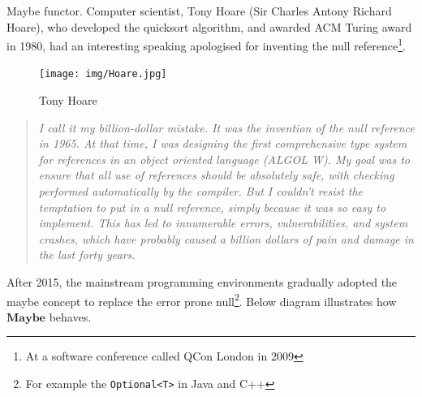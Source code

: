 \documentclass[b5paper]{article}
\begin{document}
\begin{example}
\normalfont
{}
Maybe functor. Computer scientist, Tony Hoare (Sir Charles Antony Richard Hoare), who developed the quicksort algorithm, and awarded ACM Turing award in 1980, had an interesting speaking apologised for inventing the null reference\footnote{At a software conference called QCon London in 2009}.

\begin{figure}[htbp]
 \centering
 \texttt{[image: img/Hoare.jpg]}
 \captionsetup{labelformat=empty}
 \caption{Tony Hoare}
 \label{fig:Hoare}
\end{figure}

\begin{quotation}
\itshape
I call it my billion-dollar mistake. It was the invention of the null reference in 1965. At that time, I was designing the first comprehensive type system for references in an object oriented language (ALGOL W). My goal was to ensure that all use of references should be absolutely safe, with checking performed automatically by the compiler. But I couldn't resist the temptation to put in a null reference, simply because it was so easy to implement. This has led to innumerable errors, vulnerabilities, and system crashes, which have probably caused a billion dollars of pain and damage in the last forty years\cite{Wiki-Hoare}.
\end{quotation}

After 2015, the mainstream programming environments gradually adopted the maybe concept to replace the error prone null\footnote{For example the \lstinline{Optional<T>} in Java and C++}. Below diagram illustrates how $\mathbf{Maybe}$ behaves.

\begin{center}
\end{center}


\end{example}
\end{document}
